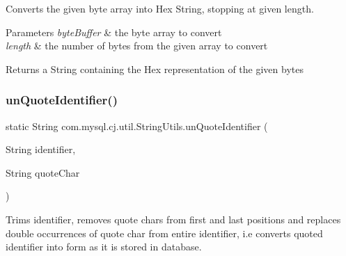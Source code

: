 Converts the given byte array into Hex String, stopping at given length.


\begin{DoxyParams}{Parameters}
{\em byte\+Buffer} & the byte array to convert \\
\hline
{\em length} & the number of bytes from the given array to convert \\
\hline
\end{DoxyParams}
\begin{DoxyReturn}{Returns}
a String containing the Hex representation of the given bytes 
\end{DoxyReturn}
\mbox{\label{classcom_1_1mysql_1_1cj_1_1util_1_1_string_utils_aa60f98a2192f4a10b89107f243fd186a}} 
\subsubsection{\texorpdfstring{un\+Quote\+Identifier()}{unQuoteIdentifier()}}
{\footnotesize\ttfamily static String com.\+mysql.\+cj.\+util.\+String\+Utils.\+un\+Quote\+Identifier (\begin{DoxyParamCaption}\item[{String}]{identifier,  }\item[{String}]{quote\+Char }\end{DoxyParamCaption})\hspace{0.3cm}{\ttfamily [static]}}

Trims identifier, removes quote chars from first and last positions and replaces double occurrences of quote char from entire identifier, i.\+e converts quoted identifier into form as it is stored in database.


